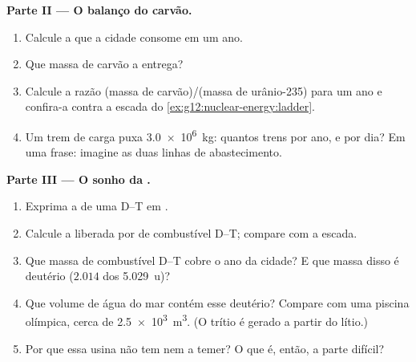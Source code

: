 \begin{problem}
\medskip
\noindent\textbf{Parte II --- O balanço do carvão.}
\begin{enumerate}[resume]
  \item Calcule a  que a cidade consome em um ano.
  \item Que massa de carvão a entrega?
  \item Calcule a razão (massa de carvão)/(massa de urânio-235) para um ano e confira-a
        contra a escada do \cref{ex:g12:nuclear-energy:ladder}.
  \item Um trem de carga puxa \qty{3.0e6}{kg}: quantos trens por ano, e por dia? Em uma
        frase: imagine as duas linhas de abastecimento.
\end{enumerate}

\medskip
\noindent\textbf{Parte III --- O sonho da .}
\begin{enumerate}[resume]
  \item Exprima a  de uma  D--T em .
  \item Calcule a  liberada por  de combustível D--T; compare com a
        escada.
  \item Que massa de combustível D--T cobre o ano da cidade? E que massa disso é
        deutério ($2.014$ dos \qty{5.029}{u})?
  \item Que volume de água do mar contém esse deutério? Compare com uma piscina
        olímpica, cerca de \qty{2.5e3}{m^3}. (O trítio é gerado a partir do lítio.)
  \item Por que essa usina não tem  nem  a temer? O que é,
        então, a parte difícil?
\end{enumerate}


\end{problem}
